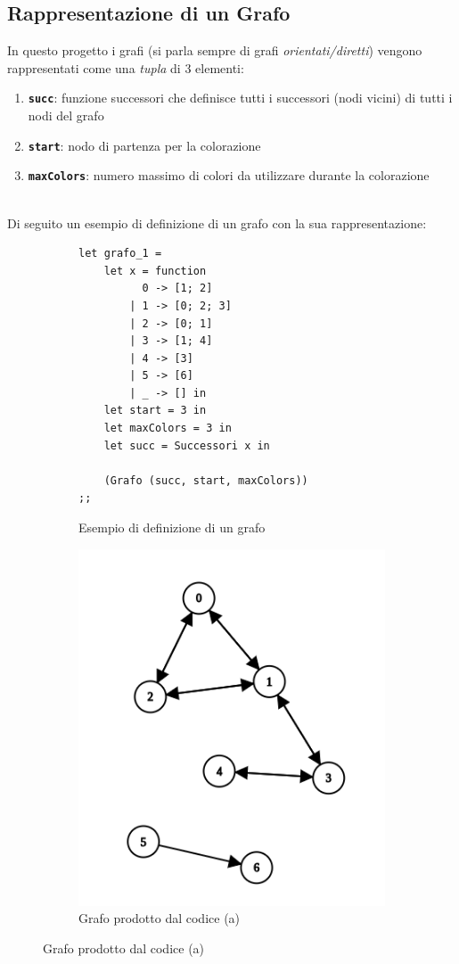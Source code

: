 \subsection{Rappresentazione di un Grafo}
In questo progetto i grafi (si parla sempre di grafi \textit{orientati/diretti}) vengono rappresentati come una \textit{tupla} di 3 elementi:

\begin{enumerate}
	\item \textbf{\lstinline[style=cmd]|succ|}: funzione successori che definisce tutti i successori (nodi vicini) di tutti i nodi del grafo
	\item \textbf{\lstinline[style=cmd]|start|}: nodo di partenza per la colorazione
	\item \textbf{\lstinline[style=cmd]|maxColors|}: numero massimo di colori da utilizzare durante la colorazione
\end{enumerate}
\ \\
Di seguito un esempio di definizione di un grafo con la sua rappresentazione: 
\begin{figure}[H]
	\begin{subfigure}[b]{.5\textwidth}
\begin{lstlisting}[style=caml]
let grafo_1 =
	let x = function        
		  0 -> [1; 2]
		| 1 -> [0; 2; 3]
		| 2 -> [0; 1]
		| 3 -> [1; 4]
		| 4 -> [3]
		| 5 -> [6]
		| _ -> [] in
	let start = 3 in
	let maxColors = 3 in
	let succ = Successori x in
	
	(Grafo (succ, start, maxColors))
;;
\end{lstlisting}
\caption{Esempio di definizione di un grafo}
	\end{subfigure}%
	\begin{subfigure}[b]{.5\textwidth}
			\centering
			\includegraphics[width=.8\linewidth]{img/grafoesempio1.png}
			\caption{Grafo prodotto dal codice (a)}
	\end{subfigure}%
\end{figure}
